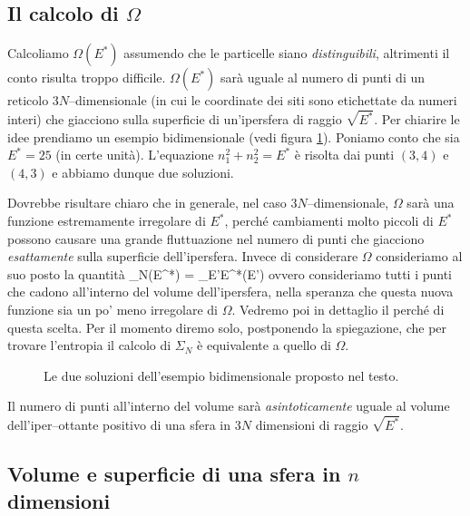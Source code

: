 \subsection{Il calcolo di $\Omega$}

Calcoliamo $\Omega(E^{*})$ assumendo che le particelle siano {\em distinguibili}, altrimenti il conto risulta troppo difficile. $\Omega(E^{*})$ sarà uguale al numero di punti di un reticolo $3N$--dimensionale (in cui le coordinate dei siti sono etichettate da numeri interi) che giacciono sulla superficie di un'ipersfera di raggio $\sqrt{E^{*}}$. Per chiarire le idee prendiamo un esempio bidimensionale (vedi figura \ref{fig:e25}). Poniamo conto che sia $E^{*} = 25$ (in certe unità). L'equazione $n^{2}_{1} + n^{2}_{2} = E^{*}$ è risolta dai punti $(3,4)$ e $(4,3)$ e abbiamo dunque due soluzioni.

Dovrebbe risultare chiaro che in generale, nel caso $3N$--dimensionale, $\Omega$ sarà una funzione estremamente irregolare di $E^{*}$, perché cambiamenti molto piccoli di $E^{*}$ possono causare una grande fluttuazione nel numero di punti che giacciono {\em esattamente} sulla superficie dell'ipersfera. Invece di considerare $\Omega$ consideriamo al suo posto la quantità
\be
\label{eq:sigma}
\Sigma_{N}(E^{*}) = \sum_{E'\le E^{*}}\Omega(E')
\ee
ovvero consideriamo tutti i punti che cadono all'interno del volume dell'ipersfera, nella speranza che questa nuova funzione sia un po' meno irregolare di $\Omega$. Vedremo poi in dettaglio il perché di questa scelta. Per il momento diremo solo, postponendo la spiegazione, che per trovare l'entropia il calcolo di $\Sigma_{N}$ è equivalente a quello di $\Omega$.

\begin{figure}[!ht]
  \centering
  
  \caption{Le due soluzioni dell'esempio bidimensionale proposto nel testo.}
  \label{fig:e25}
\end{figure}

Il numero di punti all'interno del volume sarà {\em asintoticamente} uguale al volume dell'iper--ottante positivo di una sfera in $3N$ dimensioni di raggio $\sqrt{E^{*}}$.

\subsection{Volume e superficie di una sfera in $n$ dimensioni}

